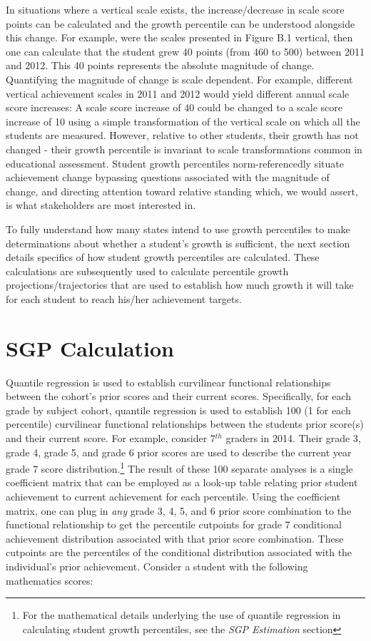 \documentclass[12pt]{article}
\begin{document}
In situations where a vertical scale exists, the increase/decrease in
scale score points can be calculated and the growth percentile can be
understood alongside this change. For example, were the scales presented
in Figure B.1 vertical, then one can calculate that the student grew 40
points (from 460 to 500) between 2011 and 2012. This 40 points
represents the absolute magnitude of change. Quantifying the magnitude
of change is scale dependent. For example, different vertical
achievement scales in 2011 and 2012 would yield different annual scale
score increases: A scale score increase of 40 could be changed to a
scale score increase of 10 using a simple transformation of the vertical
scale on which all the students are measured. However, relative to other
students, their growth has not changed - their growth percentile is
invariant to scale transformations common in educational assessment.
Student growth percentiles norm-referencedly situate achievement change
bypassing questions associated with the magnitude of change, and
directing attention toward relative standing which, we would assert, is
what stakeholders are most interested in.

To fully understand how many states intend to use growth percentiles to
make determinations about whether a student's growth is sufficient, the
next section details specifics of how student growth percentiles are
calculated. These calculations are subsequently used to calculate
percentile growth projections/trajectories that are used to establish
how much growth it will take for each student to reach his/her
achievement targets.

\pagebreak

\section{SGP Calculation}\label{sgp-calculation}

Quantile regression is used to establish curvilinear functional
relationships between the cohort's prior scores and their current
scores. Specifically, for each grade by subject cohort, quantile
regression is used to establish 100 (1 for each percentile) curvilinear
functional relationships between the students prior score(s) and their
current score. For example, consider 7\(^{th}\) graders in 2014. Their
grade 3, grade 4, grade 5, and grade 6 prior scores are used to describe
the current year grade 7 score distribution.\footnote{For the
  mathematical details underlying the use of quantile regression in
  calculating student growth percentiles, see the \emph{SGP Estimation}
  section} The result of these 100 separate analyses is a single
coefficient matrix that can be employed as a look-up table relating
prior student achievement to current achievement for each percentile.
Using the coefficient matrix, one can plug in \emph{any} grade 3, 4, 5,
and 6 prior score combination to the functional relationship to get the
percentile cutpoints for grade 7 conditional achievement distribution
associated with that prior score combination. These cutpoints are the
percentiles of the conditional distribution associated with the
individual's prior achievement. Consider a student with the following
mathematics scores:
\end{document}
